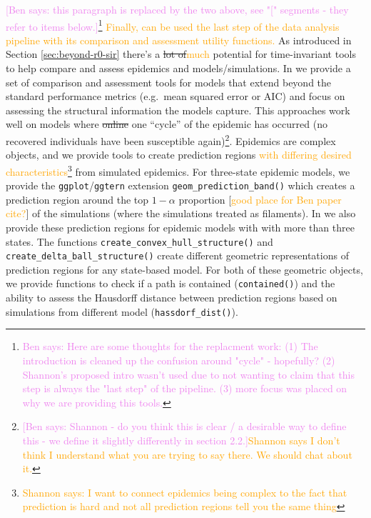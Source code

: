 \documentclass[
  shortnames]{jss}
\begin{document}
\textcolor{violet}{[Ben says: this paragraph is replaced by the two above, see "[" segments - they refer to items below.]}\footnote{\textcolor{violet}{Ben says: Here are some thoughts for the replacment work: (1) The introduction is cleaned up the confusion around "cycle" - hopefully? (2) Shannon's proposed intro wasn't used due to not wanting to claim that this step is always the "last step" of the pipeline. (3) more focus was placed on why we are providing this tools.}}
\textcolor{orange}{Finally,  can be used the last step of the data analysis pipeline with its comparison and assessment utility functions.}
As introduced in Section \ref{sec:beyond-r0-sir} there's a
\sout{lot of}\textcolor{orange}{much} potential for time-invariant tools
to help compare and assess epidemics and models/simulations. In
 we provide a set of comparison and assessment tools for
models that extend beyond the standard performance metrics (e.g.~mean
squared error or AIC) and focus on assessing the structural information
the models capture. This approaches work well on models where
\sout{online} one ``cycle'' of the epidemic has occurred (no recovered
individuals have been susceptible
again)\footnote{\textcolor{violet}{[Ben says: Shannon - do you think this is clear / a desirable way to define this - we define it slightly differently in section 2.2.]}\textcolor{orange}{Shannon says I don't think I understand what you are trying to say there.  We should chat about it.}}.
Epidemics are complex objects, and we provide tools to create prediction
regions
\textcolor{orange}{with differing desired characteristics}\footnote{\textcolor{orange}{Shannon says: I want to connect epidemics being complex to the fact that prediction is hard and not all prediction regions tell you the same thing}}
from simulated epidemics. For three-state epidemic models, we provide
the \texttt{ggplot}/\texttt{ggtern} extension
\texttt{geom\_prediction\_band()} which creates a prediction region
around the top \(1-\alpha\) proportion
{[}\textcolor{orange}{good place for Ben paper cite?}{]} of the
simulations (where the simulations treated as filaments). In
 we also provide these prediction regions for epidemic
models with with more than three states. The functions
\texttt{create\_convex\_hull\_structure()} and
\texttt{create\_delta\_ball\_structure()} create different geometric
representations of prediction regions for any state-based model. For
both of these geometric objects, we provide functions to check if a path
is contained (\texttt{contained()}) and the ability to assess the
Hausdorff distance between prediction regions based on simulations from
different model (\texttt{hassdorf\_dist()}).
\end{document}

